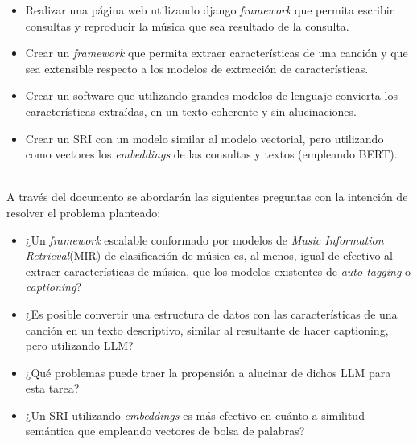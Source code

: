 \begin{itemize}
    \item Realizar una página web utilizando django \textit{framework} que permita escribir consultas y reproducir la música que sea resultado de la consulta.
    \item Crear un \textit{framework} que permita extraer características de una canción y que sea extensible respecto a los modelos de extracción de características.
    \item Crear un software que utilizando grandes modelos de lenguaje convierta los características extraídas, en un texto coherente y sin alucinaciones. 
    \item Crear un SRI con un modelo similar al modelo vectorial, pero utilizando como vectores los \textit{embeddings} de las consultas y textos (empleando BERT).
\end{itemize}\\


A través del documento se abordarán las siguientes preguntas con la intención de resolver el problema planteado:

\begin{itemize}
    \item ¿Un \textit{framework} escalable conformado por modelos de \textit{Music Information Retrieval}(MIR) de clasificación de música es, al menos, igual de efectivo al extraer características de música, que los modelos existentes de \textit{auto-tagging} o \textit{captioning}?
    \item ¿Es posible convertir una estructura de datos con las características de una canción en un texto descriptivo, similar al resultante de hacer captioning, pero utilizando LLM?
    \item ¿Qué problemas puede traer la propensión a alucinar de dichos LLM para esta tarea?
    \item ¿Un SRI utilizando \textit{embeddings} es más efectivo en cuánto a similitud semántica que empleando vectores de bolsa de palabras? %
\end{itemize}\\


